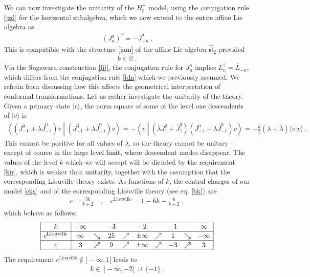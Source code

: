 \documentclass[12pt,a4paper,notitlepage]{report}
\numberwithin{equation}{section}
\theoremstyle{break}
\begin{document}
We can now investigate the unitarity of the $H_3^+$ model, using the conjugation rule \eqref{jzd} for the horizontal subalgebra, which we now extend to the entire affine Lie algebra as 
\begin{align}
 \boxed{(J^a_n)^\dagger = -\bar{J}^a_{-n}}\ .
\label{jdj}
\end{align}
This is compatible with the structure \eqref{jam} of the affine Lie algebra $\hat{\mathfrak{sl}}_2$ provided 
\begin{align}
 k\in\mathbb{R}\ .
\label{kir}
\end{align}
Via the Sugawara construction \eqref{ljj}, the conjugation rule for $J^a_n$ implies $L_n^\dagger = \bar{L}_{-n}$, which differs from the conjugation rule \eqref{ldn} which we previously assumed. 
We refrain from discussing how this affects the geometrical interpretation of conformal transformations.
Let us rather investigate the unitarity of the theory. 
Given a primary state $|v\rangle$, the norm square of some of the level one descendents of $|v\rangle$ is
\begin{align}
 \left\langle (J^0_{-1}+\lambda\bar{J}^0_{-1})v \middle| (J^0_{-1}+\lambda\bar{J}^0_{-1})v \right\rangle
= -\left\langle v \middle| (\bar{\lambda} J^0_1+\bar{J}^0_1)(J^0_{-1}+\lambda\bar{J}^0_{-1})v \right\rangle 
= -\frac{k}{2}(\lambda+\bar{\lambda}) \langle v| v\rangle\ .
\label{viv}
\end{align}
This cannot be positive for all values of $\lambda$,  
so the theory cannot be unitary -- except of course in the large level limit, where descendent modes disappear. 
The values of the level $k$ which we will accept will be dictated by the requirement \eqref{kir}, which is weaker than unitarity, together with the assumption that the corresponding Liouville theory exists.
As functions of $k$, the central charges of our model \eqref{ckg} and of the corresponding Liouville theory (see eq. \eqref{bk}) are
\begin{align}
 c = \frac{3k}{k+2} \quad , \quad c^{\text{Liouville}} = 1-6k-\frac{6}{k+2}\ ,
\end{align} 
which behave as follows:
\begin{align}
\renewcommand{\arraystretch}{1.1}
 \begin{array}{|c|ccccccccc|}
  \hline 
k & -\infty & & -3 & & -2 & & -1 & & \infty 
\\ \hline  
c^{\text{Liouville}} & \infty & \searrow & 25 & \nearrow & \pm \infty & \nearrow & 1 & \searrow & -\infty
\\ \hline
c & 3 & \nearrow & 9 & \nearrow & \pm \infty & \nearrow & -3 & \nearrow & 3
\\ \hline 
 \end{array}
\end{align}
The requirement $c^{\text{Liouville}}\notin ]-\infty,1[$ leads to 
\begin{align}
 \boxed{k\in\ ]-\infty,-2[\ \cup\ \{-1\}}\ .
\label{kito}
\end{align}
\end{document}
